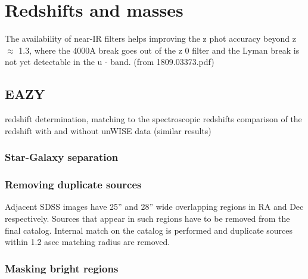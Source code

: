 \documentclass[apj,iop]{emulateapj}
\begin{document}

\section{Redshifts and masses}
The availability of near-IR filters helps improving the z phot accuracy beyond z $\approx$ 1.3, where the 4000A break goes out of the z 0 filter and the Lyman break is not yet detectable in the u - band. (from 1809.03373.pdf)

\subsection{EAZY} 
	redshift determination, matching to the spectroscopic redshifts
	comparison of the redshift with and without unWISE data (similar results)

\subsubsection{Star-Galaxy separation}

\subsubsection{Removing duplicate sources}

Adjacent SDSS images have 25'' and 28'' wide overlapping regions in RA and Dec respectively. Sources that appear in such regions have to be removed from the final catalog. Internal match on the catalog is performed and duplicate sources within 1.2 asec matching radius are removed.

\subsubsection{Masking bright regions}
\end{document}
